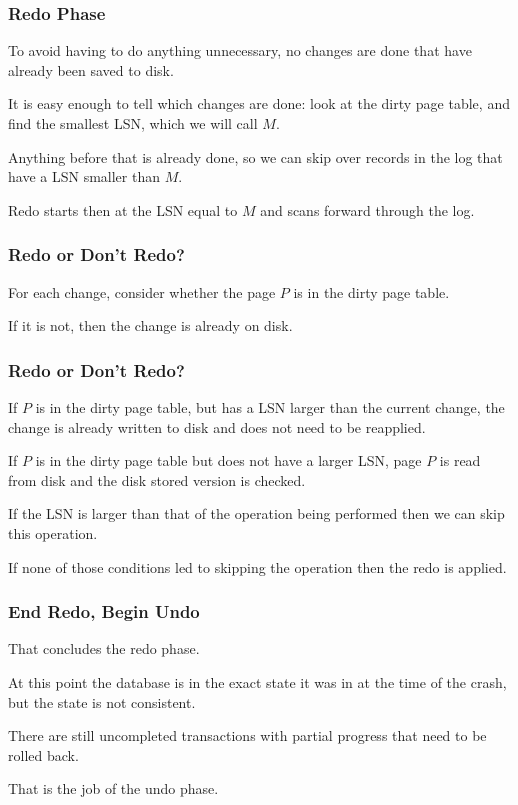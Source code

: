 \begin{frame}
\frametitle{Redo Phase}

To avoid having to do anything unnecessary, no changes are done that have already been saved to disk. 

It is easy enough to tell which changes are done: look at the dirty page table, and find the smallest LSN, which we will call $M$. 

Anything before that is already done, so we can skip over records in the log that have a LSN smaller than $M$. 

Redo starts then at the LSN equal to $M$ and scans forward through the log.

\end{frame}

\begin{frame}
\frametitle{Redo or Don't Redo?}

For each change, consider whether the page $P$ is in the dirty page table. 

If it is not, then the change is already on disk. 

\end{frame}

\begin{frame}
\frametitle{Redo or Don't Redo?}

If $P$ is in the dirty page table, but has a LSN larger than the current change, the change is already written to disk and does not need to be reapplied. 

If $P$ is in the dirty page table but does not have a larger LSN, page $P$ is read from disk and the disk stored version is checked.

If the LSN is larger than that of the operation being performed then we can skip this operation.  

If none of those conditions led to skipping the operation then the redo is applied. 


\end{frame}


\begin{frame}
\frametitle{End Redo, Begin Undo}

That concludes the redo phase. 

At this point the database is in the exact state it was in at the time of the crash, but the state is not consistent. 

There are still uncompleted transactions with partial progress that need to be rolled back. 

That is the job of the undo phase.


\end{frame}


